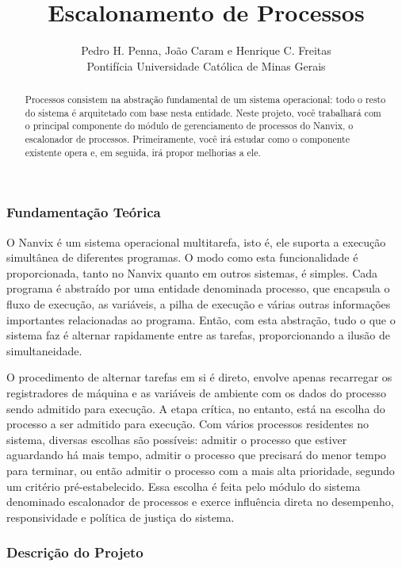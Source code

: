 \documentclass[11pt]{article}
\title{Escalonamento de Processos}
\author{Pedro H. Penna, João Caram e Henrique C. Freitas\\[0.3em]
\small Pontifícia Universidade Católica de Minas Gerais}
\date{}
\begin{document}
\maketitle

\begin{abstract}

\noindent Processos consistem na abstração fundamental de um sistema operacional: todo o resto do sistema é arquitetado com base nesta entidade. Neste projeto, você trabalhará com o principal componente do módulo de gerenciamento de processos do Nanvix, o escalonador de processos. Primeiramente, você irá estudar como o componente existente opera e, em seguida, irá propor melhorias a ele.

\end{abstract}

\subsubsection*{Fundamentação Teórica}

O Nanvix é um sistema operacional multitarefa, isto é, ele suporta a execução simultânea de diferentes programas. O modo como esta funcionalidade é proporcionada, tanto no Nanvix quanto em outros sistemas, é simples. Cada programa é abstraído por uma entidade denominada processo, que encapsula o fluxo de execução, as variáveis, a pilha de execução e várias outras informações importantes relacionadas ao programa. Então, com esta abstração, tudo o que o sistema faz é alternar rapidamente entre as tarefas, proporcionando a ilusão de simultaneidade.

O procedimento de alternar tarefas em si é direto, envolve apenas recarregar os registradores de máquina e as variáveis de ambiente com os dados do processo sendo admitido para execução. A etapa crítica, no entanto, está na escolha do processo a ser admitido para execução. Com vários processos residentes no sistema, diversas escolhas são possíveis: admitir o processo que estiver aguardando há mais tempo, admitir o processo que precisará do menor tempo para terminar, ou então admitir o processo com a mais alta prioridade, segundo um critério pré-estabelecido. Essa escolha é feita pelo módulo do sistema denominado escalonador de processos e exerce influência direta no desempenho, responsividade e política de justiça do sistema.

\subsubsection*{Descrição do Projeto}
\end{document}
